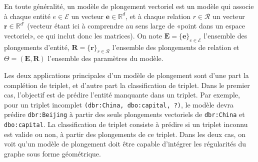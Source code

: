 En toute généralité, un modèle de plongement vectoriel est un modèle qui associe à chaque entité $e \in \mathcal{E}$ un vecteur $\mathbf{e} \in \mathbb{R}^d$, et à chaque relation $r \in \mathcal{R}$ un vecteur $\mathbf{r} \in \mathbb{R}^{d'}$ (vecteur étant ici à comprendre au sens large de «point dans un espace vectoriel», ce qui inclut donc les matrices). On note $\mathbf{E} = \{\mathbf{e}\}_{e \in \mathcal{E}} $ l'ensemble des plongements d'entité, $\mathbf{R} = \{\mathbf{r}\}_{r \in \mathcal{R}} $ l'ensemble des plongements de relation et $\Theta = (\mathbf{E}, \mathbf{R})$ l'ensemble des paramètres du modèle. 

Les deux applications principales d'un modèle de plongement sont d'une part la complétion de triplet, et d'autre part la classification de triplet. Dans le premier cas, l'objectif est de prédire l'entité manquante dans un triplet. Par exemple, pour un triplet incomplet \texttt{(dbr:China, dbo:capital, ?)}, le modèle devra prédire \texttt{dbr:Beijing} à partir des seuls plongements vectoriels de \texttt{dbr:China} et \texttt{dbo:capital}. La classification de triplet consiste à prédire si un triplet inconnu est valide ou non, à partir des plongements de ce triplet. Dans les deux cas, on voit qu'un modèle de plongement doit être capable d'intégrer les régularités du graphe sous forme géométrique.


